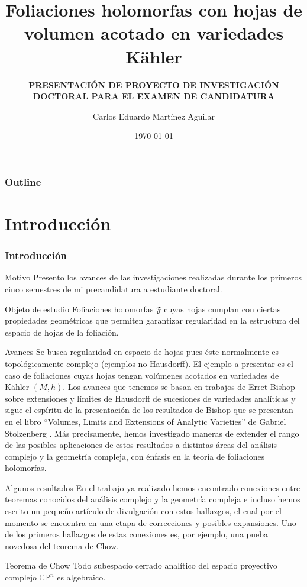 \documentclass[letterpaper]{beamer}
\title{Foliaciones holomorfas con hojas de volumen acotado en variedades K\"ahler}
\subtitle{\textbf{PRESENTACI\'ON DE PROYECTO DE INVESTIGACI\'ON DOCTORAL PARA EL EXAMEN DE CANDIDATURA}}
\author{Carlos Eduardo Mart\'inez Aguilar}
\institute{UNIVERSIDAD NACIONAL AUTONOMA DE M\'EXICO}
\date{\today}
\newcommand{\cp}{\ensuremath{\mathbb{CP}}}
\begin{document}
\begin{frame}
  \frametitle{}
  \titlepage
\end{frame}

\begin{frame}
\frametitle{Outline}
\tableofcontents
\end{frame}

\section{Introducci\'on}
\begin{frame}
\frametitle{Introducci\'on}
\begin{block}{Motivo}
Presento los avances de las investigaciones realizadas durante los primeros cinco semestres
de mi precandidatura a estudiante doctoral.
\end{block}
\begin{block}{Objeto de estudio} Foliaciones holomorfas $\mathfrak{F}$ cuyas hojas cumplan con ciertas propiedades geom\'etricas que permiten garantizar regularidad en la estructura del espacio de hojas de la foliaci\'on.
\end{block}
\end{frame}

\begin{frame}
\begin{block}{Avances}
  Se busca regularidad en espacio de hojas pues \'este normalmente es topol\'ogicamente complejo (ejemplos no Hausdorff).
  El ejemplo a presentar es el caso de foliaciones cuyas hojas tengan vol\'umenes acotados en variedades de K\"ahler $(M,h)$.
  Los avances que tenemos se basan en trabajos de Erret Bishop \cite{Bishop} sobre extensiones y l\'imites de Hausdorff
  de sucesiones de variedades anal\'iticas y sigue el esp\'iritu de la presentaci\'on de los resultados de Bishop que se presentan en el
  libro ``Volumes, Limits and Extensions of Analytic Varieties'' de Gabriel Stolzenberg \cite{Stolzenberg}.
  M\'as precisamente, hemos investigado maneras de extender el rango de las posibles aplicaciones de estos resultados a
  distintas \'areas del an\'alisis complejo y la geometr\'ia compleja, con \'enfasis en la teor\'ia de foliaciones holomorfas.
\end{block}
\end{frame}

\begin{frame}
\begin{block}{Algunos resultados}
  En el trabajo ya realizado hemos encontrado conexiones entre teoremas conocidos del an\'alisis complejo y la geometr\'ia compleja e incluso hemos
  escrito un pequeño art\'iculo de divulgaci\'on con estos hallazgos, el cual por el momento se encuentra en una etapa de correcciones
  y posibles expansiones. Uno de los primeros hallazgos de estas conexiones es, por ejemplo, una pueba novedosa del teorema
  de Chow.
\end{block}
\begin{block}{Teorema de Chow}\label{Chow}
        Todo subespacio cerrado anal\'itico del espacio proyectivo complejo $\cp^{n}$ es algebraico.
\end{block}
\end{frame}
\end{document}
